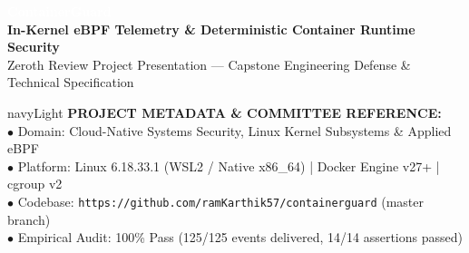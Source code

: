 \documentclass[aspectratio=169,10pt]{beamer}
\begin{document}
{
\begin{frame}[plain]
  \vspace{0.6cm}
  \vspace{0.2cm}
  
  {\Huge \textbf{\textcolor{white}{ContainerGuard}}}\\[0.25cm]
  {\Large \textbf{\textcolor{blueAccent!80}{In-Kernel eBPF Telemetry \& Deterministic Container Runtime Security}}}\\[0.3cm]
  {\normalsize \textcolor{gray!40}{Zeroth Review Project Presentation — Capstone Engineering Defense \& Technical Specification}}\\[0.6cm]


  \vspace{0.5cm}
  \begin{beamercolorbox}[wd=0.98\textwidth,rounded=true,shadow=false]{navyLight}
    \vspace{0.15cm}
    \tiny \textcolor{blueAccent!90}{\textbf{PROJECT METADATA \& COMMITTEE REFERENCE:}}\\[0.08cm]
    \textcolor{gray!30}{$\bullet$ Domain: Cloud-Native Systems Security, Linux Kernel Subsystems \& Applied eBPF}\\
    \textcolor{gray!30}{$\bullet$ Platform: Linux 6.18.33.1 (WSL2 / Native x86\_64) | Docker Engine v27+ | cgroup v2}\\
    \textcolor{gray!30}{$\bullet$ Codebase: \texttt{https://github.com/ramKarthik57/containerguard} (master branch)}\\
    \textcolor{gray!30}{$\bullet$ Empirical Audit: 100\% Pass (125/125 events delivered, 14/14 assertions passed)}
    \vspace{0.15cm}
  \end{beamercolorbox}
\end{frame}
}
\end{document}
